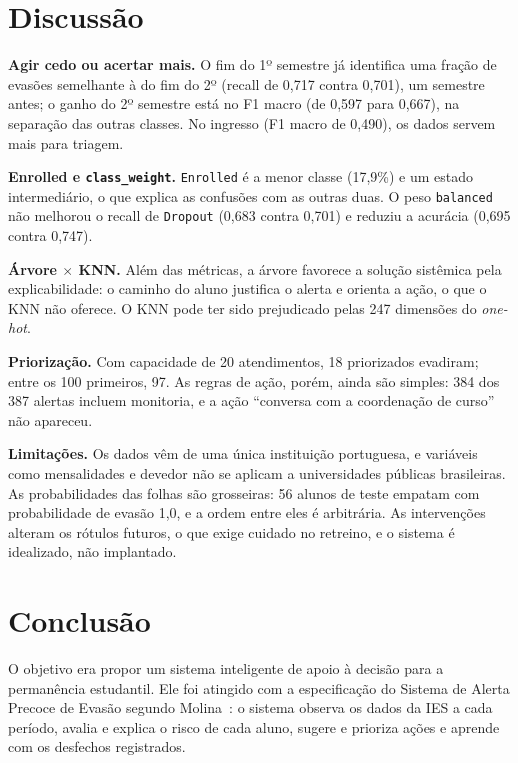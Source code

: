\documentclass[runningheads]{llncs}
\begin{document}
\section{Discussão}

\textbf{Agir cedo ou acertar mais.} O fim do 1º semestre já identifica uma fração de
evasões semelhante à do fim do 2º (recall de 0,717 contra 0,701), um semestre antes; o
ganho do 2º semestre está no F1 macro (de 0,597 para 0,667), na separação das outras
classes. No ingresso (F1 macro de 0,490), os dados servem mais para triagem.

\textbf{Enrolled e \texttt{class\_weight}.} \texttt{Enrolled} é a menor classe (17,9\%) e
um estado intermediário, o que explica as confusões com as outras duas. O peso
\texttt{balanced} não melhorou o recall de \texttt{Dropout} (0,683
contra 0,701) e reduziu a acurácia (0,695 contra 0,747).

\textbf{Árvore $\times$ KNN.} Além das métricas, a árvore favorece a solução sistêmica
pela explicabilidade: o caminho do aluno justifica o alerta e orienta a ação, o que o
KNN não oferece. O KNN pode ter sido prejudicado pelas 247 dimensões do \emph{one-hot}.

\textbf{Priorização.} Com capacidade de 20 atendimentos, 18 priorizados evadiram; entre
os 100 primeiros, 97. As regras de ação, porém, ainda são simples: 384 dos 387 alertas
incluem monitoria, e a ação ``conversa com a coordenação de curso'' não apareceu.

\textbf{Limitações.} Os dados vêm de uma única instituição portuguesa, e variáveis como
mensalidades e devedor não se aplicam a universidades públicas brasileiras. As
probabilidades das folhas são grosseiras: 56 alunos de teste empatam com probabilidade
de evasão 1,0, e a ordem entre eles é arbitrária. As intervenções alteram os rótulos
futuros, o que exige cuidado no retreino, e o sistema é idealizado, não implantado.

\section{Conclusão}

O objetivo era propor um sistema inteligente de apoio à decisão para a permanência
estudantil. Ele foi atingido com a especificação do
Sistema de Alerta Precoce de Evasão segundo Molina~\cite{molina2020}: o sistema observa
os dados da IES a cada período, avalia e explica o risco de cada aluno, sugere e
prioriza ações e aprende com os desfechos registrados.
\end{document}
